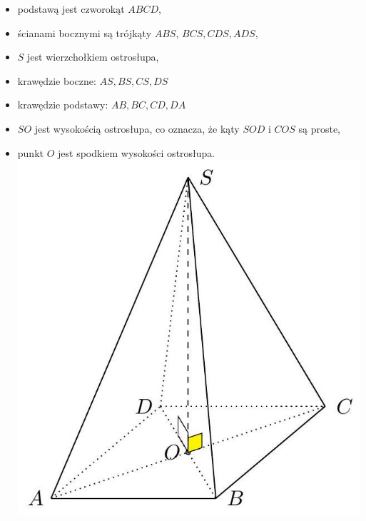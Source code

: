\documentclass[10pt]{article}
\begin{document}
\begin{itemize}
  \item podstawą jest czworokąt \(A B C D\),
  \item ścianami bocznymi są trójkąty \(A B S\), \(B C S, C D S, A D S\),
  \item \(S\) jest wierzchołkiem ostrosłupa,
  \item krawędzie boczne: \(A S, B S, C S, D S\)
  \item krawędzie podstawy: \(A B, B C, C D, D A\)
  \item \(S O\) jest wysokością ostrosłupa, co oznacza, że kąty \(S O D\) i \(C O S\) są proste,
  \item punkt \(O\) jest spodkiem wysokości ostrosłupa.\\
\includegraphics[max width=\textwidth, center]{2024_11_21_e9b4faa005d5be2cc318g-084}
\end{itemize}
\end{document}
